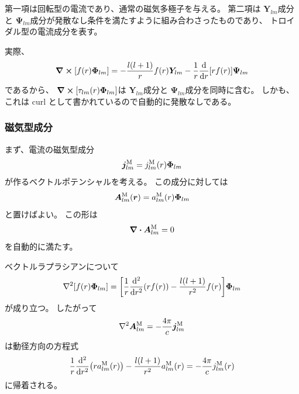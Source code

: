 \documentclass[../master.tex]{subfiles}
\begin{document}
第一項は回転型の電流であり、通常の磁気多極子を与える。
第二項は
\(\boldsymbol{Y}_{lm}\)成分と
\(\boldsymbol{\Psi}_{lm}\)成分が発散なし条件を満たすように組み合わさったものであり、
トロイダル型の電流成分を表す。

実際、
\begin{equation}
    \curl\qty[
    f(r)\boldsymbol{\Phi}_{lm}
    ]
    =
    -\frac{l(l+1)}{r}f(r)\boldsymbol{Y}_{lm}
    -
    \frac{1}{r}\dv{r}\qty[rf(r)]
    \boldsymbol{\Psi}_{lm}
\end{equation}
であるから、
\(\curl\qty[\tau_{lm}(r)\boldsymbol{\Phi}_{lm}]\)は
\(\boldsymbol{Y}_{lm}\)成分と
\(\boldsymbol{\Psi}_{lm}\)成分を同時に含む。
しかも、これは curl として書かれているので自動的に発散なしである。

\subsubsection*{磁気型成分}

まず、電流の磁気型成分
\begin{equation}
    \vb*{j}^{\mathrm{M}}_{lm}
    =
    j_{lm}^{\mathrm{M}}(r)\boldsymbol{\Phi}_{lm}
\end{equation}
が作るベクトルポテンシャルを考える。
この成分に対しては
\begin{equation}
    \vb*{A}^{\mathrm{M}}_{lm}(\vb*{r})
    =
    a_{lm}^{\mathrm{M}}(r)
    \boldsymbol{\Phi}_{lm}
\end{equation}
と置けばよい。
この形は
\begin{equation}
    \div\vb*{A}^{\mathrm{M}}_{lm}=0
\end{equation}
を自動的に満たす。

ベクトルラプラシアンについて
\begin{equation}
    \laplacian
    \qty[
    f(r)\boldsymbol{\Phi}_{lm}
    ]
    =
    \qty[
    \frac{1}{r}\dv[2]{r}\qty(rf(r))
    -
    \frac{l(l+1)}{r^2}f(r)
    ]
    \boldsymbol{\Phi}_{lm}
\end{equation}
が成り立つ。
したがって
\begin{equation}
    \laplacian\vb*{A}^{\mathrm{M}}_{lm}
    =
    -\frac{4\pi}{c}
    \vb*{j}^{\mathrm{M}}_{lm}
\end{equation}
は動径方向の方程式
\begin{equation}
    \frac{1}{r}\dv[2]{r}
    \qty(ra_{lm}^{\mathrm{M}}(r))
    -
    \frac{l(l+1)}{r^2}a_{lm}^{\mathrm{M}}(r)
    =
    -\frac{4\pi}{c}j_{lm}^{\mathrm{M}}(r)
\end{equation}
に帰着される。
\end{document}
